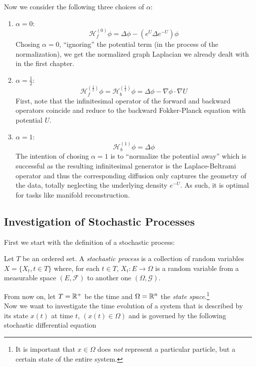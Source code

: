 Now we consider the following three choices of $\alpha$:

\begin{enumerate}

\item $\alpha = 0$:
$$\mathcal{H}_f^{(0)}\phi = \Delta\phi - (e^U\Delta e^{-U})\phi$$
Chosing $\alpha = 0$, ``ignoring'' the potential term (in the process of the normalization), we get the normalized graph Laplacian we already dealt with in the first chapter.

\item $\alpha = \frac{1}{2}$:
$$\mathcal{H}_f^{(\frac{1}{2})}\phi = \mathcal{H}_b^{(\frac{1}{2})}\phi = \Delta\phi - \nabla\phi\cdot\nabla U$$
First, note that the infinitesimal operator of the forward and backward operators coincide and reduce to the backward Fokker-Planck equation with potential $U$.

\item $\alpha = 1$:
$$\mathcal{H}_b^{(1)}\phi = \Delta\phi$$
The intention of chosing $\alpha = 1$ is to ``normalize the potential away'' which is successful as the resulting infinitesimal generator is the Laplace-Beltrami operator and thus the corresponding diffusion only captures the geometry of the data, totally neglecting the underlying density $e^{-U}$. As such, it is optimal for tasks like manifold reconstruction.

\end{enumerate}

\subsection{Investigation of Stochastic Processes}
First we start with the definition of a stochastic process:

\begin{definition}
Let $T$ be an ordered set. A \textit{stochastic process} is a collection of random variables $X=\{X_t,t\in T\}$ where, for each $t\in T$, $X_t: E\rightarrow \Omega$ is a random variable from a measurable space $(E, \mathcal{F})$ to another one $(\Omega, \mathcal{G})$.
\end{definition}

From now on, let $T=\mathbb{R}^+$ be the time and $\Omega=\mathbb{R}^n$ the \textit{state space}.\footnote{It is important that $x\in\Omega$ does \textit{not} represent a particular particle, but a certain state of the entire system.} \\

Now we want to investigate the time evolution of a system that is described by its state $x(t)$ at time $t$, $(x(t)\in\Omega)$ and is governed by the following stochastic differential equation

